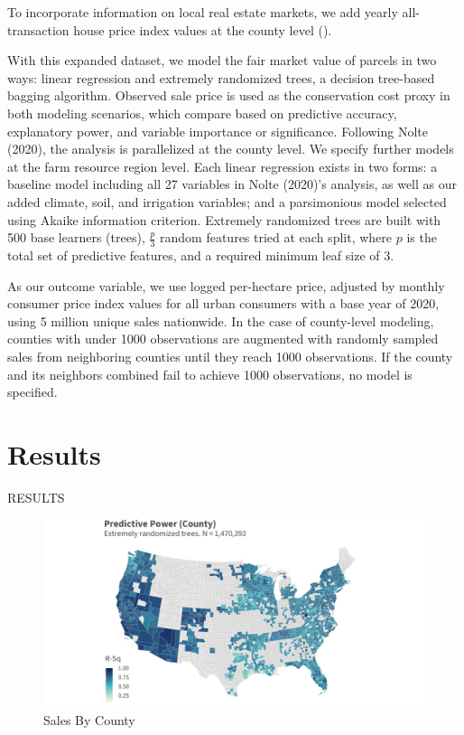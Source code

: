 \documentclass[12pt]{article}
\begin{document}
To incorporate information on local real estate markets, we add yearly all-transaction house price index values at the county level (\cite{FederalHousing2022}).

With this expanded dataset, we model the fair market value of parcels in two ways: linear regression and extremely randomized trees, a decision tree-based bagging algorithm. Observed sale price is used as the conservation cost proxy in both modeling scenarios, which compare based on predictive accuracy, explanatory power, and variable importance or significance. Following Nolte (2020), the analysis is parallelized at the county level. We specify further models at the farm resource region level. Each linear regression exists in two forms: a baseline model including all 27 variables in Nolte (2020)’s analysis, as well as our added climate, soil, and irrigation variables; and a parsimonious model selected using Akaike information criterion. Extremely randomized trees are built with 500 base learners (trees), $\frac{p}{3}$ random features tried at each split, where $p$ is the total set of predictive features, and a required minimum leaf size of 3.

As our outcome variable, we use logged per-hectare price, adjusted by monthly consumer price index values for all urban consumers with a base year of 2020, using 5 million unique sales nationwide. In the case of county-level modeling, counties with under 1000 observations are augmented with randomly sampled sales from neighboring counties until they reach 1000 observations. If the county and its neighbors combined fail to achieve 1000 observations, no model is specified. 

\newpage

\section{Results}

RESULTS

\begin{figure}
    \centering
    \includegraphics[width=6in]{figures/rf_rsq_map.png}
    \caption{Sales By County}
    \label{fig:rsq_county}
\end{figure}
\end{document}
